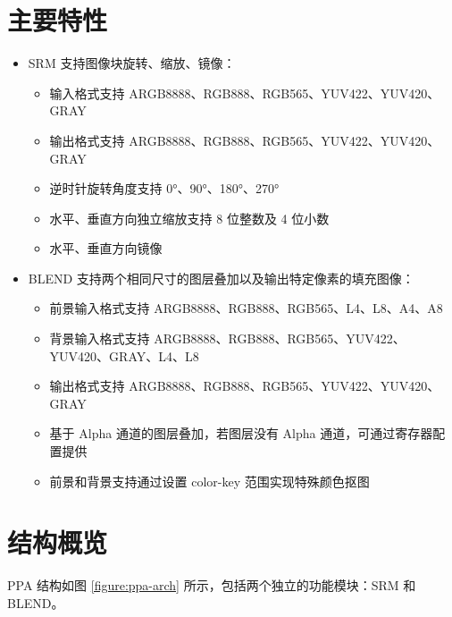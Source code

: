 \documentclass[main\_\_CN.tex]{subfiles}
\begin{document}

\section{主要特性}

\begin{itemize}
    \item SRM 支持图像块旋转、缩放、镜像：
        \begin{itemize}
            \item 输入格式支持 ARGB8888、RGB888、RGB565、YUV422、YUV420、GRAY
            \item 输出格式支持 ARGB8888、RGB888、RGB565、YUV422、YUV420、GRAY
            \item 逆时针旋转角度支持 0°、90°、180°、270°
            \item 水平、垂直方向独立缩放支持 8 位整数及 4 位小数
            \item 水平、垂直方向镜像
        \end{itemize}
    \item BLEND 支持两个相同尺寸的图层叠加以及输出特定像素的填充图像：
        \begin{itemize}
            \item 前景输入格式支持 ARGB8888、RGB888、RGB565、L4、L8、A4、A8
            \item 背景输入格式支持 ARGB8888、RGB888、RGB565、YUV422、YUV420、GRAY、L4、L8
            \item 输出格式支持 ARGB8888、RGB888、RGB565、YUV422、YUV420、GRAY
            \item 基于 Alpha 通道的图层叠加，若图层没有 Alpha 通道，可通过寄存器配置提供
            \item 前景和背景支持通过设置 color-key 范围实现特殊颜色抠图
        \end{itemize}
\end{itemize}




\section{结构概览}
\label{sec:ppa-arch-overview}

PPA 结构如图 \ref{figure:ppa-arch} 所示，包括两个独立的功能模块：SRM 和 BLEND。
\end{document}
